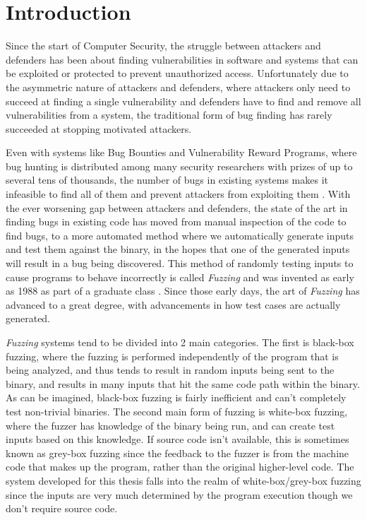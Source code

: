 \chapter{Introduction}
Since the start of Computer Security, the struggle between attackers and
defenders has been about finding vulnerabilities in software and systems that
can be exploited or protected to prevent unauthorized access. Unfortunately due
to the asymmetric nature of attackers and defenders, where attackers only need
to succeed at finding a single vulnerability and defenders have to find and
remove all vulnerabilities from a system, the traditional form of bug finding
has rarely succeeded at stopping motivated attackers.

Even with systems like Bug Bounties and Vulnerability Reward Programs, where bug
hunting is distributed among many security researchers with prizes of up to
several tens of thousands, the number of bugs in existing systems makes it
infeasible to find all of them and prevent attackers from exploiting
them \cite{googlevrp}. With the ever worsening gap between attackers and
defenders, the state of the art in finding bugs in existing code has moved from
manual inspection of the code to find bugs, to a more automated method where we
automatically generate inputs and test them against the binary, in the hopes
that one of the generated inputs will result in a bug being discovered. This
method of randomly testing inputs to cause programs to behave incorrectly is
called \textit{Fuzzing} and was invented as early as 1988 as part of a graduate
class \cite{fuzzingorigin}. Since those early days, the art of \textit{Fuzzing}
has advanced to a great degree, with advancements in how test cases are actually
generated.

\textit{Fuzzing} systems tend to be divided into 2 main categories. The first is
black-box fuzzing, where the fuzzing is performed independently of the program
that is being analyzed, and thus tends to result in random inputs being sent to
the binary, and results in many inputs that hit the same code path within the
binary. As can be imagined, black-box fuzzing is fairly inefficient and can't
completely test non-trivial binaries. The second main form of fuzzing is
white-box fuzzing, where the fuzzer has knowledge of the binary being run, and
can create test inputs based on this knowledge. If source code isn't available,
this is sometimes known as grey-box fuzzing since the feedback to the fuzzer is
from the machine code that makes up the program, rather than the original
higher-level code. The system developed for this thesis falls into the realm of
white-box/grey-box fuzzing since the inputs are very much determined by the
program execution though we don't require source code.

